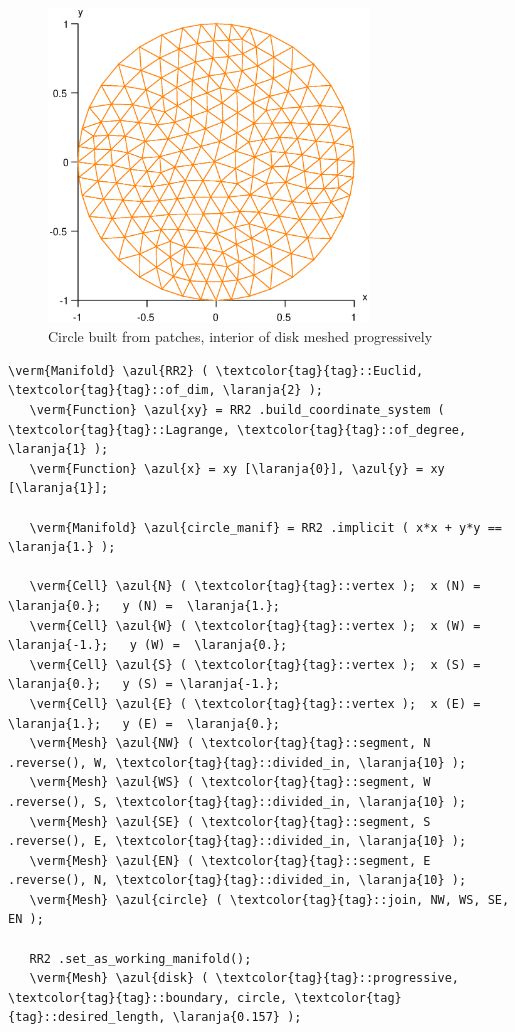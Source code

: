 \begin{figure} \centering
 \includegraphics[width=85mm]{disk-with-tri}
 \caption{Circle built from patches, interior of disk meshed progressively}
 \label{\numb section 3.\numb fig 1}
\end{figure}

\begin{Verbatim}[commandchars=\\\{\},formatcom=\small\tt,frame=single,
   label=parag-\ref{\numb section 3.\numb parag 1}.cpp,rulecolor=\color{coment},
   baselinestretch=0.94,framesep=2mm                                            ]
   \verm{Manifold} \azul{RR2} ( \textcolor{tag}{tag}::Euclid, \textcolor{tag}{tag}::of_dim, \laranja{2} );
   \verm{Function} \azul{xy} = RR2 .build_coordinate_system ( \textcolor{tag}{tag}::Lagrange, \textcolor{tag}{tag}::of_degree, \laranja{1} );
   \verm{Function} \azul{x} = xy [\laranja{0}], \azul{y} = xy [\laranja{1}];
   
   \verm{Manifold} \azul{circle_manif} = RR2 .implicit ( x*x + y*y == \laranja{1.} );
   
   \verm{Cell} \azul{N} ( \textcolor{tag}{tag}::vertex );  x (N) =  \laranja{0.};   y (N) =  \laranja{1.};
   \verm{Cell} \azul{W} ( \textcolor{tag}{tag}::vertex );  x (W) = \laranja{-1.};   y (W) =  \laranja{0.};
   \verm{Cell} \azul{S} ( \textcolor{tag}{tag}::vertex );  x (S) =  \laranja{0.};   y (S) = \laranja{-1.};
   \verm{Cell} \azul{E} ( \textcolor{tag}{tag}::vertex );  x (E) =  \laranja{1.};   y (E) =  \laranja{0.};
   \verm{Mesh} \azul{NW} ( \textcolor{tag}{tag}::segment, N .reverse(), W, \textcolor{tag}{tag}::divided_in, \laranja{10} );
   \verm{Mesh} \azul{WS} ( \textcolor{tag}{tag}::segment, W .reverse(), S, \textcolor{tag}{tag}::divided_in, \laranja{10} );
   \verm{Mesh} \azul{SE} ( \textcolor{tag}{tag}::segment, S .reverse(), E, \textcolor{tag}{tag}::divided_in, \laranja{10} );
   \verm{Mesh} \azul{EN} ( \textcolor{tag}{tag}::segment, E .reverse(), N, \textcolor{tag}{tag}::divided_in, \laranja{10} );
   \verm{Mesh} \azul{circle} ( \textcolor{tag}{tag}::join, NW, WS, SE, EN );
   
   RR2 .set_as_working_manifold();
   \verm{Mesh} \azul{disk} ( \textcolor{tag}{tag}::progressive, \textcolor{tag}{tag}::boundary, circle, \textcolor{tag}{tag}::desired_length, \laranja{0.157} );
\end{Verbatim}

